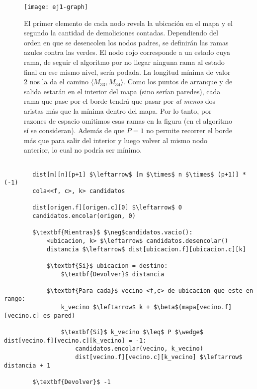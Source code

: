     \begin{figure}[H]
        \centering
        \texttt{[image: ej1-graph]}
        \caption{El primer elemento de cada nodo revela la ubicación en el mapa y el segundo la cantidad de demoliciones contadas. Dependiendo del orden en que se desencolen los nodos padres, se definirán las ramas azules contra las verdes. El nodo rojo corresponde a un estado cuya rama, de seguir el algoritmo por no llegar ninguna rama al estado final en ese mismo nivel, sería podada. La longitud mínima de valor $2$ nos la da el camino $\langle {M_{33}, M_{34}} \rangle$. Como los puntos de arranque y de salida estarán en el interior del mapa (sino serían paredes), cada rama que pase por el borde tendrá que pasar por \emph{al menos} dos aristas más que la mínima dentro del mapa. Por lo tanto, por razones de espacio omitimos esas ramas en la figura (en el algoritmo sí se consideran). Además de que $P=1$ no permite recorrer el borde más que para salir del interior y luego volver al mismo nodo anterior, lo cual no podría ser mínimo.}
        \label{fig:ej1-graph}
    \end{figure}

    \begin{lstlisting}[caption={Pseudoc\'odigo de la resoluci\'on. En 'candidatos' se guardan los nodos tentativos que quedan por visitar. En dist se guarda la menor distancia que tienen al origen que, por iterar haciendo BFS, es la del primer camino en alcanzar dicho nodo.}]

        dist[m][n][p+1] $\leftarrow$ [m $\times$ n $\times$ (p+1)] * (-1)
        cola<<f, c>, k> candidatos

        dist[origen.f][origen.c][0] $\leftarrow$ 0
        candidatos.encolar(origen, 0)

        $\textbf{Mientras}$ $\neg$candidatos.vacio():
            <ubicacion, k> $\leftarrow$ candidatos.desencolar()
            distancia $\leftarrow$ dist[ubicacion.f][ubicacion.c][k]

            $\textbf{Si}$ ubicacion = destino:
                $\textbf{Devolver}$ distancia

            $\textbf{Para cada}$ vecino <f,c> de ubicacion que este en rango:
                k_vecino $\leftarrow$ k + $\beta$(mapa[vecino.f][vecino.c] es pared)

                $\textbf{Si}$ k_vecino $\leq$ P $\wedge$ dist[vecino.f][vecino.c][k_vecino] = -1:
                    candidatos.encolar(vecino, k_vecino)
                    dist[vecino.f][vecino.c][k_vecino] $\leftarrow$ distancia + 1

        $\textbf{Devolver}$ -1
    \end{lstlisting}


